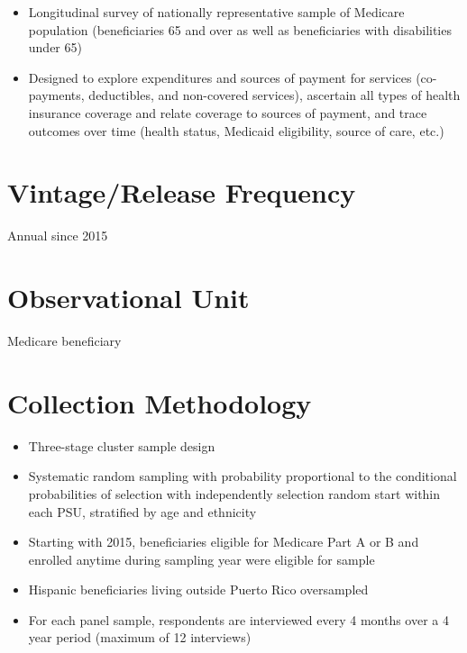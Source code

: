 \documentclass[
]{book}
\providecommand{\tightlist}{%
  \setlength{\itemsep}{0pt}\setlength{\parskip}{0pt}}
\begin{document}
\begin{itemize}
\tightlist
\item
  Longitudinal survey of nationally representative sample of Medicare population (beneficiaries 65 and over as well as beneficiaries with disabilities under 65)
\item
  Designed to explore expenditures and sources of payment for services (co-payments, deductibles, and non-covered services), ascertain all types of health insurance coverage and relate coverage to sources of payment, and trace outcomes over time (health status, Medicaid eligibility, source of care, etc.)
\end{itemize}

\hypertarget{vintagerelease-frequency-38}{%
\section{Vintage/Release Frequency}\label{vintagerelease-frequency-38}}

Annual since 2015

\hypertarget{observational-unit-38}{%
\section{Observational Unit}\label{observational-unit-38}}

Medicare beneficiary

\hypertarget{collection-methodology-38}{%
\section{Collection Methodology}\label{collection-methodology-38}}

\begin{itemize}
\tightlist
\item
  Three-stage cluster sample design
\item
  Systematic random sampling with probability proportional to the conditional probabilities of selection with independently selection random start within each PSU, stratified by age and ethnicity
\item
  Starting with 2015, beneficiaries eligible for Medicare Part A or B and enrolled anytime during sampling year were eligible for sample
\item
  Hispanic beneficiaries living outside Puerto Rico oversampled
\item
  For each panel sample, respondents are interviewed every 4 months over a 4 year period (maximum of 12 interviews)
\end{itemize}
\end{document}
